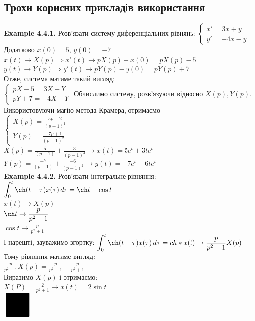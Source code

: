 \documentclass[a4paper, 14pt]{extarticle}
\def\hugespace{\vspace{5mm} \\}
\begin{document}
\subsection{Трохи корисних прикладів використання}
\textbf{Example 4.4.1.} Розв'язати систему диференціальних рівнянь:
$\begin{cases}
x' = 3x + y \\
y' = -4x - y
\end{cases}
$\\
Додатково $x(0) = 5$, $y(0) = -7$\\
$x(t) \rightarrow X(p) \Rightarrow x'(t) \rightarrow pX(p) - x(0) = pX(p) - 5$\\
$y(t) \rightarrow Y(p) \Rightarrow y'(t) \rightarrow pY(p) - y(0) = pY(p) + 7$\\
Отже, система матиме такий вигляд:\\
$\begin{cases}
pX - 5 = 3X + Y\\
pY + 7 = -4X - Y
\end{cases}
$
Обчислимо систему, розв'язуючи відносно $X(p), Y(p)$. Використовуючи магію метода Крамера, отримаємо\\
$\begin{cases}
\displaystyle X(p) = \frac{5p-2}{(p-1)^2}\\
\displaystyle Y(p) = \frac{-7p+1}{(p-1)^2}
\end{cases}
$\\
$\displaystyle X(p) = \frac{5}{(p-1)} + \frac{3}{(p-1)^2} \rightarrow x(t) = 5e^t + 3t e^t$\\
$\displaystyle Y(p) = \frac{-7}{(p-1)} + \frac{-6}{(p-1)^2} \rightarrow y(t) = -7e^t - 6t e^t$
\hugespace
\textbf{Example 4.4.2.} Розв'язати інтегральне рівняння:\\
$\displaystyle \int_0^t \ch (t- \tau) x(\tau) \,d\tau = \ch t - \cos t$\\
$x(t) \rightarrow X(p)$\\
$\ch t \rightarrow \displaystyle \frac{p}{p^2-1}$\\
$\cos t \rightarrow \displaystyle \frac{p}{p^2+1}$\\
І нарешті, зауважимо згортку: $\displaystyle \int_0^t \ch(t-\tau) x(\tau)\,d\tau = ch * x(t) \rightarrow \frac{p}{p^2-1} X(p)$
Тому рівняння матиме вигляд:\\
$\displaystyle \frac{p}{p^2-1} X(p) = \frac{p}{p^2-1} - \frac{p}{p^2+1}$\\
Виразимо $X(p)$ і отримаємо:\\
$\displaystyle X(P) = \frac{2}{p^2+1} \rightarrow x(t) = 2 \sin t$
\hugespace
$\scaleobj{5}{\blacksquare}$
\end{document}
